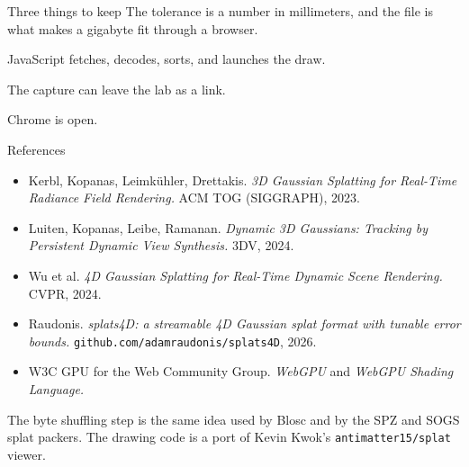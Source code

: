 \documentclass[aspectratio=169,10pt]{beamer}
\begin{document}
\begin{frame}{Three things to keep}
  The tolerance is a number in millimeters, and the file is what makes a gigabyte fit through a browser.

  \vspace{0.7em}
  JavaScript fetches, decodes, sorts, and launches the draw.

  \vspace{0.7em}
  The capture can leave the lab as a link.

  \vspace{1em}
  \centering
  \Large Chrome is open.
\end{frame}

\begin{frame}{References}
  \footnotesize
  \begin{itemize}
    \item Kerbl, Kopanas, Leimk\"uhler, Drettakis. \textit{3D Gaussian Splatting for Real-Time Radiance Field Rendering.} ACM TOG (SIGGRAPH), 2023.
    \item Luiten, Kopanas, Leibe, Ramanan. \textit{Dynamic 3D Gaussians: Tracking by Persistent Dynamic View Synthesis.} 3DV, 2024.
    \item Wu et al. \textit{4D Gaussian Splatting for Real-Time Dynamic Scene Rendering.} CVPR, 2024.
    \item Raudonis. \textit{splats4D: a streamable 4D Gaussian splat format with tunable error bounds.} \texttt{github.com/adamraudonis/splats4D}, 2026.
    \item W3C GPU for the Web Community Group. \textit{WebGPU} and \textit{WebGPU Shading Language.}
  \end{itemize}
  \vspace{0.4em}
  The byte shuffling step is the same idea used by Blosc and by the SPZ and SOGS splat packers. The drawing code is a port of Kevin Kwok's \texttt{antimatter15/splat} viewer.
\end{frame}
\end{document}
